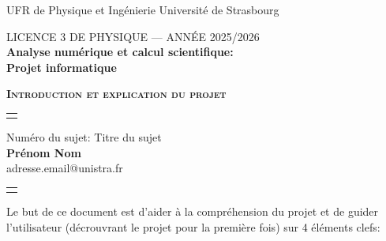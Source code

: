 \documentclass[12pt,a4paper]{article}
\newcommand{\bc}{\begin{center}}
\newcommand{\ec}{\end{center}}
\begin{document}
 

\noindent UFR de Physique et Ing\'enierie  \hfill Université de Strasbourg
\vspace{1cm}

\bc
LICENCE 3 DE PHYSIQUE --- ANN\'EE 2025/2026 \\ 
\textbf{Analyse numérique et calcul scientifique:\\
 Projet informatique}\\
\ec
 
\bc
{\LARGE\bfseries \textsc{Introduction et explication du projet}}\\[14pt]
\ec

\noindent
\begin{tabular}{p{16cm}}
 \hline
 \\
\end{tabular}


\bc
{\large Numéro du sujet: Titre du sujet}\\[14pt]
{\Large\bfseries Prénom Nom}\\[5pt]
adresse.email@unistra.fr

\ec

\noindent
\begin{tabular}{p{16cm}}
 \hline
 \\
\end{tabular}


\noindent Le but de ce document est d'aider à la compréhension du projet et de guider l'utilisateur (décrouvrant le projet pour la première fois) sur 4 éléments clefs:\\
\end{document}
